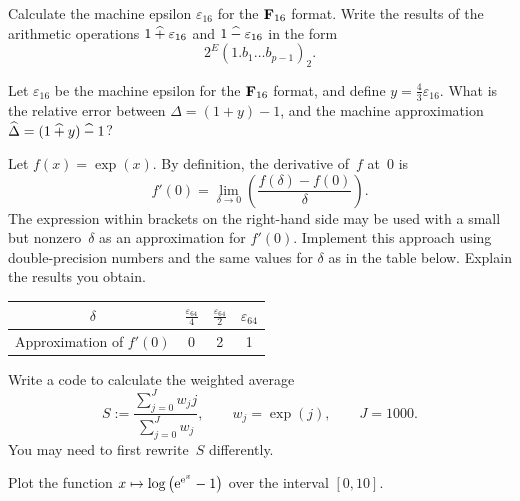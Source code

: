 \begin{exercise}
    Calculate the machine epsilon $\varepsilon_{16}$ for the $\mathbf F_{16}$ format.
    Write the results of the arithmetic operations $1 \mathbin{\widehat +} \varepsilon_{16}$ and $1 \mathbin{\widehat -} \varepsilon_{16}$ in the form
    \[
        2^E (1.b_1 \dotsc b_{p-1})_2.
    \]
\end{exercise}

\begin{exercise}
    Let $\varepsilon_{16}$ be the machine epsilon for the $\mathbf F_{16}$ format,
    and define $y = \frac{4}{3} \varepsilon_{16}$.
    What is the relative error between $\Delta = (1 + y) - 1$,
    and the machine approximation $\widehat \Delta = (1 \mathbin{\widehat +} y) \mathbin{\widehat -} 1$?
\end{exercise}

\begin{compexercise}
    Let $f(x) = \exp(x)$.
    By definition, the derivative of~$f$ at~$0$ is
    \[
        f'(0) = \lim_{\delta \to 0} \left( \frac{f(\delta) - f(0)}{\delta} \right).
    \]
    The expression within brackets on the right-hand side may be used
    with a small but nonzero~$\delta$ as an approximation for $f'(0)$.
    Implement this approach using double-precision numbers and the same values for $\delta$ as in the table below.
    Explain the results you obtain.
    \begin{center}
        \def\arraystretch{1.5}
        \begin{tabular}{|c|c|c|c|}
            \hline
            $\delta$ & $\frac{\varepsilon_{64}}{4} $ & $\frac{\varepsilon_{64}}{2}$ & $\varepsilon_{64}$ \\
            \hline
            Approximation of $f'(0)$ & 0 & 2 & 1 \\
            \hline
        \end{tabular}
    \end{center}
\end{compexercise}

\begin{compexercise}
    Write a code to calculate the weighted average
    \[
        S := \frac
        {\sum_{j=0}^{J} w_j j}
        {\sum_{j=0}^{J} w_j},
        \qquad w_j = \exp(j),
        \qquad J = 1000.
    \]
    You may need to first rewrite~$S$ differently.
\end{compexercise}

\begin{compexercise}
    Plot the function $x \mapsto \log\left(\mathrm e^{\mathrm e^x} - 1\right)$ over the interval $[0, 10]$.
\end{compexercise}

